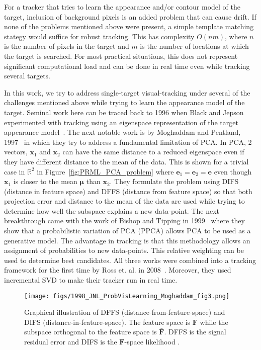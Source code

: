 For a tracker that tries to learn the appearance and/or contour model of the target, inclusion of background pixels is an added problem that can cause drift.  If none of the problems mentioned above were present, a simple template matching stategy would suffice for robust tracking.  This has complexity $O(nm)$, where $n$ is the number of pixels in the target and $m$ is the number of locations at which the target is searched.  For most practical situations, this does not represent significant computational load and can be done in real time even while tracking several targets.

In this work, we try to address single-target visual-tracking under several of the challenges mentioned above while trying to learn the appearance model of the target.  Seminal work here can be traced back to 1996 when Black and Jepson experimented with tracking using an eigenspace representation of the target appearance model~\cite{1998_JNL_Eigentracking_Black}.  The next notable work is by Moghaddam and Pentland, 1997~\cite{1997_JNL_EigenTRK_Moghaddam} in which they try to address a fundamental limitation of PCA.  In PCA, 2 vectors, $\mathbf{x}_1$ and $\mathbf{x}_2$ can have the same distance to a reduced eigenspace even if they have different distance to the mean of the data.  This is shown for a trivial case in $\mathbb{R}^2$ in Figure~\ref{fig:PRML_PCA_problem} where $\mathbf{e}_1=\mathbf{e}_2=\mathbf{e}$ even though $\mathbf{x}_1$ is closer to the mean $\boldsymbol\mu$ than $\mathbf{x}_2$.  They formulate the problem using DIFS (distance in feature space) and DFFS (distance from feature space) so that both projection error and distance to the mean of the data are used while trying to determine how well the subspace explains a new data-point.  The next breakthrough came with the work of Bishop and Tipping in 1999~\cite{1999_JNL_PPCA_Tipping} where they show that a probabilistic variation of PCA (PPCA) allows PCA to be used as a generative model.  The advantage in tracking is that this methodology allows an assignment of probabilities to new data-points.  This relative weighting can be used to determine best candidates.  All three works were combined into a tracking framework for the first time by Ross et. al. in 2008~\cite{2008_JNL_subspaceTRK_Ross}.  Moreover, they used incremental SVD to make their tracker run in real time.  

								\begin{figure}[t]
								\centering
								\texttt{[image: figs/1998\_JNL\_ProbVisLearning\_Moghaddam\_fig3.png]}
								\caption{Graphical illustration of DFFS (distance-from-feature-space) and DIFS (distance-in-feature-space).  The feature space is $\mathbf{F}$ while the subspace orthogonal to the feature space is $\bar{\mathbf{F}}$.  DFFS is the signal residual error and DIFS is the $\mathbf{F}$-space likelihood \cite{1997_JNL_EigenTRK_Moghaddam}.}
								\label{fig:1997_JNL_DIFSDFFS_Moghaddam}
								\end{figure}

